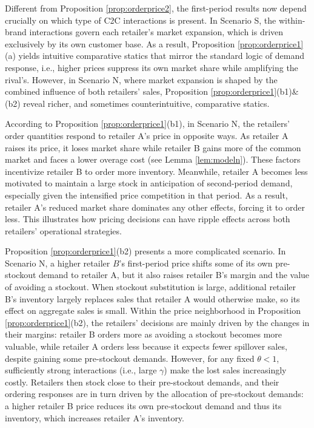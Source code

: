 \documentclass[nonblindrev,copyedit]{informs1}
\begin{document}
Different from Proposition \ref{prop:orderprice2}, the first-period results now depend crucially on which type of C2C interactions is present. In Scenario S, the within-brand interactions govern each retailer's market expansion, which is driven exclusively by its own customer base. As a result, Proposition \ref{prop:orderprice1}(a) yields intuitive comparative statics that mirror the standard logic of demand response, i.e., higher prices suppress its own market share while amplifying the rival's. However, in Scenario N, where market expansion is shaped by the combined influence of both retailers’ sales, Proposition \ref{prop:orderprice1}(b1)\&(b2) reveal richer, and sometimes counterintuitive, comparative statics.

According to Proposition \ref{prop:orderprice1}(b1), in Scenario N, the retailers' order quantities respond to retailer A's price in opposite ways. As retailer A raises its price, it loses market share while retailer B gains more of the common market and faces a lower overage cost (see Lemma \ref{lem:modeln}). These factors incentivize retailer B to order more inventory. Meanwhile, retailer A becomes less motivated to maintain a large stock in anticipation of second-period demand, especially given the intensified price competition in that period. As a result, retailer A's reduced market share dominates any other effects, forcing it to order less. This illustrates how pricing decisions can have ripple effects across both retailers' operational strategies.

Proposition \ref{prop:orderprice1}(b2) presents a more complicated scenario. In Scenario N, a higher retailer $B$'s first-period price shifts some of its own pre-stockout demand to retailer A, but it also raises retailer B’s margin and the value of avoiding a stockout. When stockout substitution is large, additional retailer B's inventory largely replaces sales that retailer A would otherwise make, so its effect on aggregate sales is small. Within the price neighborhood in Proposition \ref{prop:orderprice1}(b2), the retailers' decisions are mainly driven by the changes in their margins: retailer B orders more as avoiding a stockout becomes more valuable, while retailer A orders less because it expects fewer spillover sales, despite gaining some pre-stockout demands. However, for any fixed $\theta<1$, sufficiently strong interactions (i.e., large $\gamma$) make the lost sales increasingly costly. Retailers then stock close to their pre-stockout demands, and their ordering responses are in turn driven by the allocation of pre-stockout demands: a higher retailer B price reduces its own pre-stockout demand and thus its inventory, which increases retailer A's inventory.
\end{document}
